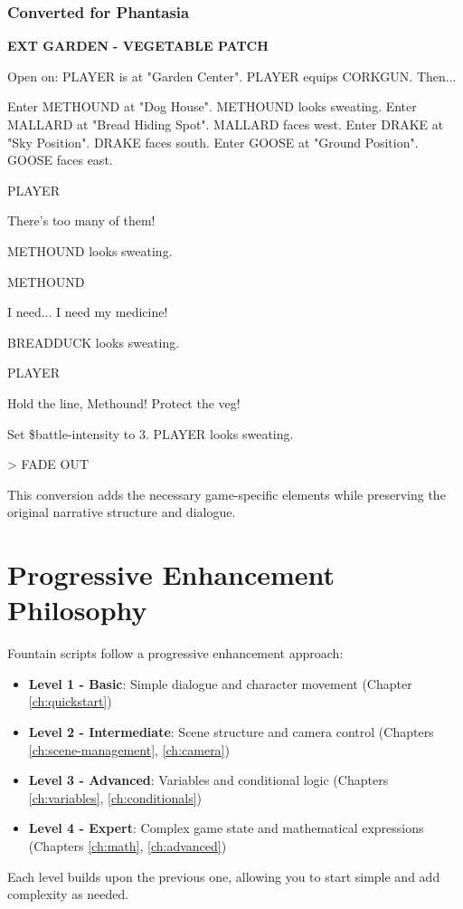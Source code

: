 \documentclass[11pt,letterpaper,oldstylefigures]{memoir}
\newcommand{\slugline}[1]{\nobreak\textbf{\MakeUppercase{#1}}\par\nobreak\vspace{1\baselineskip}}
\newcommand{\speaker}[1]{\nobreak\hspace*{0.333\textwidth}\MakeUppercase{#1}\par\nobreak\vspace{0.5\baselineskip}}
\newcommand{\dialogue}[1]{\nobreak\hspace*{0.25\textwidth}\begin{minipage}{0.5\textwidth}#1\end{minipage}\par\vspace{1\baselineskip}}
\newcommand{\stagedir}[1]{#1\par\vspace{1\baselineskip}}
\newenvironment{FountainExample}
  {\begingroup
  \ttfamily\small
   \setlength{\parindent}{0pt}
  \setlength{\parskip}{0.5em}
  \allowdisplaybreaks
  \setlength{\displaywidowpenalty}{0}
  \setlength{\widowpenalty}{0}
  \setlength{\clubpenalty}{0}
  \setlength{\interlinepenalty}{0}
}
  {\endgroup}
\newcommand{\sceneendcmd}[1]{\begin{flushright}\ttfamily #1\end{flushright}}
\begin{document}
\subsubsection{Converted for Phantasia}
\begin{FountainExample}
\slugline{EXT GARDEN - VEGETABLE PATCH}
\stagedir{Open on: PLAYER is at "Garden Center". PLAYER equips CORKGUN. Then...}
\stagedir{Enter METHOUND at "Dog House". METHOUND looks sweating. Enter MALLARD at "Bread Hiding Spot". MALLARD faces west. Enter DRAKE at "Sky Position". DRAKE faces south. Enter GOOSE at "Ground Position". GOOSE faces east.}

\speaker{PLAYER}
\dialogue{There's too many of them!}

\stagedir{METHOUND looks sweating.}

\speaker{METHOUND}
\dialogue{I need... I need my medicine!}

\stagedir{BREADDUCK looks sweating.}

\speaker{PLAYER}
\dialogue{Hold the line, Methound! Protect the veg!}

\stagedir{Set \$battle-intensity to 3. PLAYER looks sweating.}

\sceneendcmd{> FADE OUT}
\end{FountainExample}
This conversion adds the necessary game-specific elements while preserving the original narrative structure and dialogue.
\section{Progressive Enhancement Philosophy}
Fountain scripts follow a progressive enhancement approach:

\begin{itemize}
\item \textbf{Level 1 - Basic}: Simple dialogue and character movement (Chapter \ref{ch:quickstart})
\item \textbf{Level 2 - Intermediate}: Scene structure and camera control (Chapters \ref{ch:scene-management}, \ref{ch:camera})
\item \textbf{Level 3 - Advanced}: Variables and conditional logic (Chapters \ref{ch:variables}, \ref{ch:conditionals})
\item \textbf{Level 4 - Expert}: Complex game state and mathematical expressions (Chapters \ref{ch:math}, \ref{ch:advanced})
\end{itemize}

Each level builds upon the previous one, allowing you to start simple and add complexity as needed.
\end{document}
